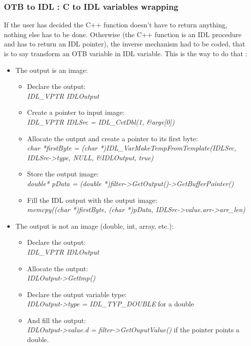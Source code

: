 \subsubsection{OTB to IDL : C to IDL variables wrapping}
If the user has decided the C++ function doesn't have to return anything, nothing else has to be done.
Otherwise (the C++ function is an IDL procedure and  has to return an IDL pointer), the inverse mechanism had to be coded, that is to say transform an OTB variable in IDL variable.
This is the way to do that :
\begin{itemize}
  \item The output is an image:
    \begin{itemize}
    \item Declare the output:\\ \emph{IDL\_VPTR IDLOutput}
    \item Create a pointer to input image:\\ \emph{IDL\_VPTR IDLSrc = IDL\_CvtDbl(1, \&argv[0])}
    \item Allocate the output and create a pointer to its first byte:\\ \emph{char *firstByte = (char *)IDL\_VarMakeTempFromTemplate(IDLSrc, IDLSrc->type, NULL, \&IDLOutput, true)}  
    \item Store the output image:\\ \emph{double* pData = (double *)filter->GetOutput()->GetBufferPointer()} 
    \item Fill the IDL output with the output image:\\ \emph{memcpy((char *)firstByte, (char *)pData, IDLSrc->value.arr->arr\_len)}
    \end{itemize}
  \item The output is not an image (double, int, array, etc.):
    \begin{itemize}
    \item Declare the output:\\ \emph{IDL\_VPTR IDLOutput} 
    \item Allocate the output:\\ \emph{IDLOutput->Gettmp()}
    \item Declare the output variable type:\\ \emph{IDLOutput->type = IDL\_TYP\_DOUBLE} for a double
    \item And fill the output:\\ \emph{IDLOutput->value.d = filter->GetOuputValue()} if the pointer points a double. 
    \end{itemize}
\end{itemize}


